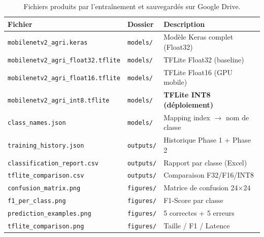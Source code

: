 \documentclass[12pt, a4paper, twoside]{report}
\begin{document}
\begin{table}[H]
\centering
\caption{Fichiers produits par l'entraînement et sauvegardés sur Google Drive.}
\label{tab:artefacts}
\small
\begin{tabular}{lll}
\toprule
\textbf{Fichier} & \textbf{Dossier} & \textbf{Description} \\
\midrule
\texttt{mobilenetv2\_agri.keras}         & \texttt{models/} & Modèle Keras complet (Float32) \\
\texttt{mobilenetv2\_agri\_float32.tflite} & \texttt{models/} & TFLite Float32 (baseline) \\
\texttt{mobilenetv2\_agri\_float16.tflite} & \texttt{models/} & TFLite Float16 (GPU mobile) \\
\texttt{mobilenetv2\_agri\_int8.tflite}  & \texttt{models/} & \textbf{TFLite INT8 (déploiement)} \\
\texttt{class\_names.json}               & \texttt{models/} & Mapping index $\rightarrow$ nom de classe \\
\texttt{training\_history.json}          & \texttt{outputs/} & Historique Phase 1 + Phase 2 \\
\texttt{classification\_report.csv}      & \texttt{outputs/} & Rapport par classe (Excel) \\
\texttt{tflite\_comparison.csv}          & \texttt{outputs/} & Comparaison F32/F16/INT8 \\
\texttt{confusion\_matrix.png}           & \texttt{figures/} & Matrice de confusion 24$\times$24 \\
\texttt{f1\_per\_class.png}              & \texttt{figures/} & F1-Score par classe \\
\texttt{prediction\_examples.png}        & \texttt{figures/} & 5 correctes + 5 erreurs \\
\texttt{tflite\_comparison.png}          & \texttt{figures/} & Taille / F1 / Latence \\
\bottomrule
\end{tabular}
\end{table}
\end{document}
